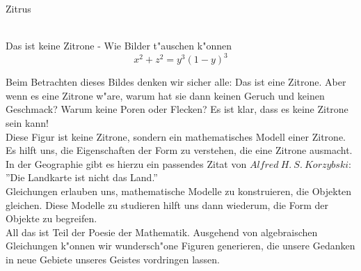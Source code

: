 \documentclass[de]{./../../common/SurferDesc}%
\begin{document}
\footnotesize

\begin{surferPage}
  \begin{surferTitle} Zitrus\end{surferTitle}  \\ %
Das ist keine Zitrone - Wie Bilder t"auschen k"onnen\\
\smallskip
\[x^2 + z^2 = y^3 (1 - y)^3\] 


\singlespacing
Beim Betrachten dieses Bildes denken wir sicher alle: Das ist eine Zitrone. Aber wenn es eine Zitrone w"are, warum hat sie dann keinen Geruch und keinen Geschmack? Warum keine Poren oder Flecken? Es ist klar, dass es keine Zitrone sein kann!\\
\singlespacing
Diese Figur ist keine Zitrone, sondern ein mathematisches Modell einer Zitrone. Es hilft uns, die Eigenschaften der Form zu verstehen, die eine Zitrone ausmacht. In der Geographie gibt es hierzu ein passendes Zitat von $Alfred\ H.\ S.\ Korzybski$: ''Die Landkarte ist nicht das Land.'' \\
\singlespacing
Gleichungen erlauben uns, mathematische Modelle zu konstruieren, die Objekten gleichen. Diese Modelle zu studieren hilft uns dann wiederum, die Form der Objekte zu begreifen.\\
\singlespacing
All das ist Teil der Poesie der Mathematik. Ausgehend von algebraischen Gleichungen k"onnen wir wundersch"one Figuren generieren, die unsere Gedanken in neue Gebiete unseres Geistes vordringen lassen.\\




  \begin{surferText}
     \end{surferText}
\end{surferPage}
\end{document}
